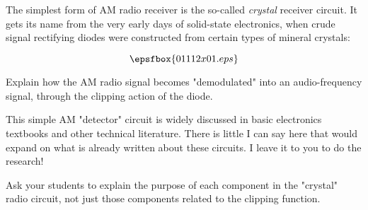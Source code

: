 

The simplest form of AM radio receiver is the so-called {\it crystal} receiver circuit.  It gets its name from the very early days of solid-state electronics, when crude signal rectifying diodes were constructed from certain types of mineral crystals:

$$\epsfbox{01112x01.eps}$$

Explain how the AM radio signal becomes "demodulated" into an audio-frequency signal, through the clipping action of the diode.







This simple AM "detector" circuit is widely discussed in basic electronics textbooks and other technical literature.  There is little I can say here that would expand on what is already written about these circuits.  I leave it to you to do the research!







Ask your students to explain the purpose of each component in the "crystal" radio circuit, not just those components related to the clipping function.




